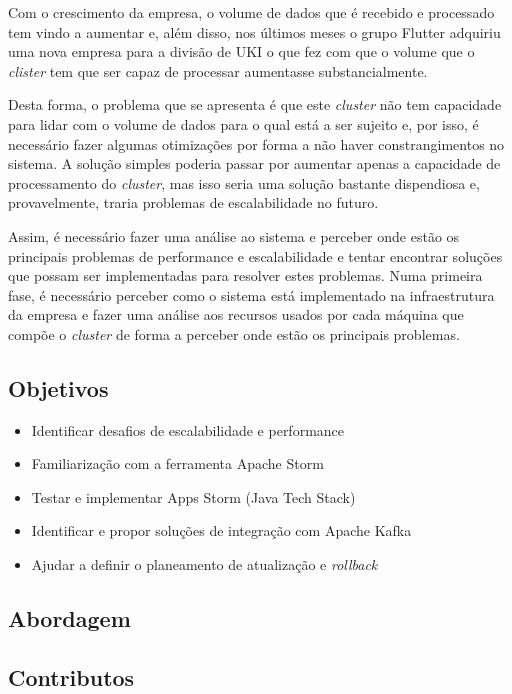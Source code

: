 Com o crescimento da empresa, o volume de dados que é recebido e processado tem vindo a aumentar
e, além disso, nos últimos meses o grupo Flutter adquiriu uma nova empresa para a divisão de \ac{UKI}
o que fez com que o volume que o \textit{clister} tem que ser capaz de processar aumentasse
substancialmente.

Desta forma, o problema que se apresenta é que este \textit{cluster} não tem capacidade para lidar
com o volume de dados para o qual está a ser sujeito e, por isso, é necessário fazer algumas
otimizações por forma a não haver constrangimentos no sistema. A solução simples poderia passar
por aumentar apenas a capacidade de processamento do \textit{cluster}, mas isso seria uma solução
bastante dispendiosa e, provavelmente, traria problemas de escalabilidade no futuro.

Assim, é necessário fazer uma análise ao sistema e perceber onde estão os principais problemas
de performance e escalabilidade e tentar encontrar soluções que possam ser implementadas para
resolver estes problemas. Numa primeira fase, é necessário perceber como o sistema está implementado
na infraestrutura da empresa e fazer uma análise aos recursos usados por cada máquina que compõe
o \textit{cluster} de forma a perceber onde estão os principais problemas.

\subsection{Objetivos}
\label{sec:1-obj}

\begin{itemize}
  \item Identificar desafios de escalabilidade e performance
  \item Familiarização com a ferramenta Apache Storm 
  \item Testar e implementar Apps Storm (Java Tech Stack) 
  \item Identificar e propor soluções de integração com Apache Kafka 
  \item Ajudar a definir o planeamento de atualização e \textit{rollback}
\end{itemize}

\subsection{Abordagem}


\subsection{Contributos}


